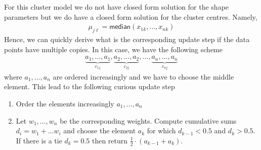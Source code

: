 \documentclass{article}
\begin{document}
For this cluster model we do not have closed form solution for the shape parameters but we do have a closed form solution for the cluster centres. Namely, 
\begin{align*}
\mu_{j\ell}=\mathsf{median}(x_{1k},\ldots, x_{nk})
\end{align*}
Hence, we can quickly derive what is the corresponding update step if the data points have multiple copies. In this case, we have the following scheme 
\begin{align*}
\underbrace{a_1,\ldots,a_1}_{c_{1j}},\underbrace{a_2,\ldots,a_2}_{c_{2j}},\ldots,\underbrace{a_n,\ldots,a_n}_{c_{nj}} 
\end{align*}     
where $a_1,\ldots,a_n$ are ordered increasingly and we have to choose the middle element. This lead to the following curious update step
\begin{enumerate}
\item Order the elements increasingly $a_1,\ldots,a_n$
\item Let $w_1,\ldots,w_n$ be the corresponding weights. Compute cumulative sums
$d_i=w_1+\ldots w_i$  and choose the element $a_k$ for which $d_{k-1}< 0.5$ and $d_k>0.5$. If there is a tie $d_k=0.5$ then return $\frac{1}{2}\cdot(a_{k-1}+a_k)$.  
\end{enumerate} 
\end{document}
